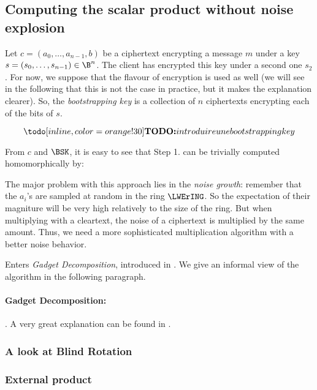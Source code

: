\subsection{Computing the scalar product without noise explosion}

Let $c = (a_0, \dots, a_{n-1}, b)$ be a \LWE ciphertext encrypting a message $m$ under a key $s = (s_0, \dots, s_{n-1}) \in \B^n$. The client has encrypted this key under a second one $s_2$. For now, we suppose that the \LWE flavour of encryption is used as well (we will see in the following that this is not the case in practice, but it makes the explanation clearer). So, the \textit{bootstrapping key} is a collection of $n$ ciphertexts encrypting each of the bits of $s$.

\begin{equation}
	\TODO{introduire une bootstrapping key}
\end{equation}


From $c$ and $\BSK$, it is easy to see that Step 1. can be trivially computed homomorphically by:



The major problem with this approach lies in the \textit{noise growth}: remember that the $a_i$'s are sampled at random in the ring $\LWErING$. So the expectation of their magniture will be very high relatively to the size of the ring. But when multiplying with a cleartext, the noise of a ciphertext is multiplied by the same amount. Thus, we need a more sophisticated multiplication algorithm with a better noise behavior.

Enters \textit{Gadget Decomposition}, introduced in \cite{}. We give an informal view of the algorithm in the following paragraph.


\paragraph{Gadget Decomposition: }




 . A very great explanation can be found in \cite{}.







\subsubsection{A look at Blind Rotation}




\subsubsection{External product}



